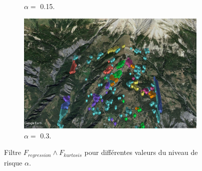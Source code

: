 \documentclass[11pt, openany]{report}
\begin{document}
\begin{figure}[!h]
\begin{subfigure}[b]{0.5\textwidth}
    \caption{$\alpha = $ 0.15.}
    \label{fig:f2}
  \end{subfigure}
    \hfill
  \begin{subfigure}[b]{0.5\textwidth}
    \includegraphics[width=\textwidth]{test_reg_kurtosis_3.jpg}
    \caption{$\alpha = $ 0.3.}
    \label{fig:f2}
  \end{subfigure}
  \caption{Filtre $F_{regression} \wedge F_{kurtosis}$ pour différentes valeurs du niveau de risque $\alpha$.}
\end{figure}
\end{document}
